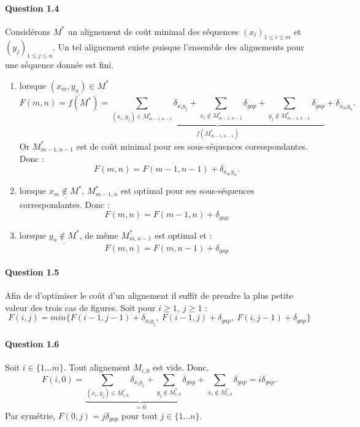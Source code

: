 \paragraph{Question 1.4}
Consid\'erons $M^*$ un alignement de co\^ut minimal des s\'equences
$(x_i)_{1\leq i\leq m}$ et $(y_j)_{1\leq j\leq n}$. Un tel alignement
existe puisque l'ensemble des alignements pour une s\'equence donn\'ee
est fini.
\begin{enumerate}
\item lorsque $\underline{(x_m,y_n)\in M^*}$
  \begin{equation*}
    F(m,n) = f(M^*) = \underbrace{
      \sum_{(x_i,y_j)\in M_{m-1,n-1}^*}\delta_{x_iy_j} +
      \sum_{x_i\not\in M_{m-1,n-1}^*}\delta_{gap} + \sum_{y_j\not\in M_{m-1,n-1}^*}\delta_{gap}}_{f(M_{m-1,n-1}^*)}
    + \delta_{x_my_n}.
  \end{equation*}
  Or $M^*_{m-1,n-1}$ est de co\^ut minimal pour ses sous-s\'equences
  coresspondantes. Donc :
  \begin{equation*}
    F(m,n) = F(m-1, n-1) + \delta_{x_my_n}.
  \end{equation*}
\item lorsque $\underline{x_m\not\in M^*}$, $M^*_{m-1,n}$ est optimal pour ses
  sous-s\'equences correspondantes. Donc :
  \begin{equation*}
    F(m,n)=F(m-1,n)+\delta_{gap}
  \end{equation*}
\item lorsque $\underline{y_n\not\in M^*}$, de m\^eme $M^*_{m,n-1}$
  est optimal et :
  \begin{equation*}
    F(m,n)=F(m,n-1)+\delta_{gap}
  \end{equation*}
\end{enumerate}
\paragraph{Question 1.5}
Afin de d'optimiser le co\^ut d'un alignement il suffit de prendre la
plus petite valeur des trois cas de figures. Soit pour 
$i\geq 1,\ j\geq 1$ :
\begin{equation*}
  F(i,j)=min\Big\{F(i-1,j-1)+\delta_{x_iy_j},
  \ F(i-1,j)+\delta_{gap},\ F(i,j-1)+\delta_{gap}\Big\}
\end{equation*}
\paragraph{Question 1.6}
Soit $i\in \{1\ldots m\}$. Tout alignement $M_{i,0}$ est vide. Donc,
\begin{equation*}
  F(i,0) = 
  \underbrace{
    \sum_{(x_i,y_j)\in M_{i,0}^*}\delta_{x_iy_j} +
    \sum_{y_j\not\in M_{i,0}^*}\delta_{gap}
  }_{=0} +
  \sum_{x_i\not\in M_{i,0}^*}\delta_{gap}
  = i\delta_{gap}.
\end{equation*}
Par sym\'etrie, $F(0,j)=j\delta_{gap}$ pour tout $j\in\{1\ldots n\}$.
